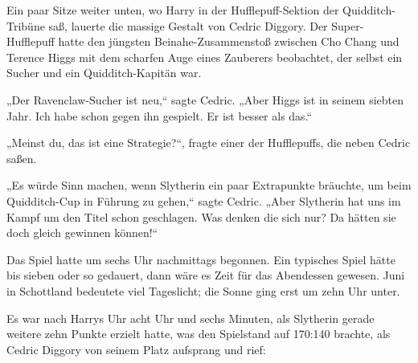 Ein paar Sitze weiter unten, wo Harry in der Hufflepuff-Sektion der Quidditch-Tribüne saß, lauerte die massige Gestalt von Cedric Diggory. Der Super-Hufflepuff hatte den jüngsten Beinahe-Zusammenstoß zwischen Cho Chang und Terence Higgs mit dem scharfen Auge eines Zauberers beobachtet, der selbst ein Sucher und ein Quidditch-Kapitän war.

„Der Ravenclaw-Sucher ist neu,“ sagte Cedric. „Aber Higgs ist in seinem siebten Jahr. Ich habe schon gegen ihn gespielt. Er ist besser als das.“

„Meinst du, das ist eine Strategie?“, fragte einer der Hufflepuffs, die neben Cedric saßen.

„Es würde Sinn machen, wenn Slytherin ein paar Extrapunkte bräuchte, um beim Quidditch-Cup in Führung zu gehen,“ sagte Cedric. „Aber Slytherin hat uns im Kampf um den Titel schon geschlagen. Was denken die sich nur? Da hätten sie doch gleich gewinnen können!“

Das Spiel hatte um sechs Uhr nachmittags begonnen. Ein typisches Spiel hätte bis sieben oder so gedauert, dann wäre es Zeit für das Abendessen gewesen.
Juni in Schottland bedeutete viel Tageslicht; die Sonne ging erst um zehn Uhr unter.

Es war nach Harrys Uhr acht Uhr und sechs Minuten, als Slytherin gerade weitere zehn Punkte erzielt hatte, was den Spielstand auf 170:140 brachte, als Cedric Diggory von seinem Platz aufsprang und rief:

